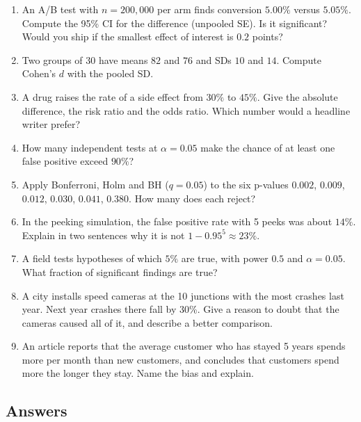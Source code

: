 \begin{enumerate}
\item An A/B test with $n=200{,}000$ per arm finds conversion $5.00\%$ versus
  $5.05\%$. Compute the 95\% CI for the difference (unpooled SE). Is it
  significant? Would you ship if the smallest effect of interest is $0.2$ points?
\item Two groups of 30 have means $82$ and $76$ and SDs $10$ and $14$. Compute
  Cohen's $d$ with the pooled SD.
\item A drug raises the rate of a side effect from $30\%$ to $45\%$. Give the
  absolute difference, the risk ratio and the odds ratio. Which number would a
  headline writer prefer?
\item How many independent tests at $\alpha=0.05$ make the chance of at least one
  false positive exceed $90\%$?
\item Apply Bonferroni, Holm and BH ($q=0.05$) to the six p-values
  $0.002$, $0.009$, $0.012$, $0.030$, $0.041$, $0.380$. How many does each reject?
\item In the peeking simulation, the false positive rate with 5 peeks was about
  $14\%$. Explain in two sentences why it is not $1-0.95^5\approx 23\%$.
\item A field tests hypotheses of which $5\%$ are true, with power $0.5$ and
  $\alpha=0.05$. What fraction of significant findings are true?
\item A city installs speed cameras at the 10 junctions with the most crashes last
  year. Next year crashes there fall by 30\%. Give a reason to doubt that the cameras
  caused all of it, and describe a better comparison.
\item An article reports that the average customer who has stayed 5 years spends
  more per month than new customers, and concludes that customers spend more the
  longer they stay. Name the bias and explain.
\end{enumerate}

\subsection*{Answers}

